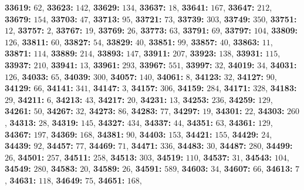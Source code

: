 \textsf{\bfseries 33619:} $62$, \textsf{\bfseries 33623:} $142$, \textsf{\bfseries 33629:} $134$, \textsf{\bfseries 33637:} $18$, \textsf{\bfseries 33641:} $167$, \textsf{\bfseries 33647:} $212$, \textsf{\bfseries 33679:} $154$, \textsf{\bfseries 33703:} $47$, \textsf{\bfseries 33713:} $95$, \textsf{\bfseries 33721:} $73$, \textsf{\bfseries 33739:} $303$, \textsf{\bfseries 33749:} $350$, \textsf{\bfseries 33751:} $12$, \textsf{\bfseries 33757:} $2$, \textsf{\bfseries 33767:} $19$, \textsf{\bfseries 33769:} $26$, \textsf{\bfseries 33773:} $63$, \textsf{\bfseries 33791:} $69$, \textsf{\bfseries 33797:} $104$, \textsf{\bfseries 33809:} $126$, \textsf{\bfseries 33811:} $60$, \textsf{\bfseries 33827:} $54$, \textsf{\bfseries 33829:} $40$, \textsf{\bfseries 33851:} $99$, \textsf{\bfseries 33857:} $40$, \textsf{\bfseries 33863:} $11$, \textsf{\bfseries 33871:} $114$, \textsf{\bfseries 33889:} $214$, \textsf{\bfseries 33893:} $147$, \textsf{\bfseries 33911:} $207$, \textsf{\bfseries 33923:} $138$, \textsf{\bfseries 33931:} $115$, \textsf{\bfseries 33937:} $210$, \textsf{\bfseries 33941:} $13$, \textsf{\bfseries 33961:} $293$, \textsf{\bfseries 33967:} $551$, \textsf{\bfseries 33997:} $32$, \textsf{\bfseries 34019:} $34$, \textsf{\bfseries 34031:} $126$, \textsf{\bfseries 34033:} $65$, \textsf{\bfseries 34039:} $300$, \textsf{\bfseries 34057:} $140$, \textsf{\bfseries 34061:} $8$, \textsf{\bfseries 34123:} $32$, \textsf{\bfseries 34127:} $90$, \textsf{\bfseries 34129:} $66$, \textsf{\bfseries 34141:} $341$, \textsf{\bfseries 34147:} $3$, \textsf{\bfseries 34157:} $306$, \textsf{\bfseries 34159:} $284$, \textsf{\bfseries 34171:} $328$, \textsf{\bfseries 34183:} $29$, \textsf{\bfseries 34211:} $6$, \textsf{\bfseries 34213:} $43$, \textsf{\bfseries 34217:} $20$, \textsf{\bfseries 34231:} $13$, \textsf{\bfseries 34253:} $236$, \textsf{\bfseries 34259:} $129$, \textsf{\bfseries 34261:} $50$, \textsf{\bfseries 34267:} $32$, \textsf{\bfseries 34273:} $86$, \textsf{\bfseries 34283:} $77$, \textsf{\bfseries 34297:} $19$, \textsf{\bfseries 34301:} $22$, \textsf{\bfseries 34303:} $260$, \textsf{\bfseries 34313:} $28$, \textsf{\bfseries 34319:} $145$, \textsf{\bfseries 34327:} $434$, \textsf{\bfseries 34337:} $44$, \textsf{\bfseries 34351:} $63$, \textsf{\bfseries 34361:} $129$, \textsf{\bfseries 34367:} $197$, \textsf{\bfseries 34369:} $168$, \textsf{\bfseries 34381:} $90$, \textsf{\bfseries 34403:} $153$, \textsf{\bfseries 34421:} $155$, \textsf{\bfseries 34429:} $24$, \textsf{\bfseries 34439:} $92$, \textsf{\bfseries 34457:} $77$, \textsf{\bfseries 34469:} $71$, \textsf{\bfseries 34471:} $336$, \textsf{\bfseries 34483:} $30$, \textsf{\bfseries 34487:} $280$, \textsf{\bfseries 34499:} $26$, \textsf{\bfseries 34501:} $257$, \textsf{\bfseries 34511:} $258$, \textsf{\bfseries 34513:} $303$, \textsf{\bfseries 34519:} $110$, \textsf{\bfseries 34537:} $31$, \textsf{\bfseries 34543:} $104$, \textsf{\bfseries 34549:} $280$, \textsf{\bfseries 34583:} $20$, \textsf{\bfseries 34589:} $26$, \textsf{\bfseries 34591:} $589$, \textsf{\bfseries 34603:} $34$, \textsf{\bfseries 34607:} $66$, \textsf{\bfseries 34613:} $7$, \textsf{\bfseries 34631:} $118$, \textsf{\bfseries 34649:} $75$, \textsf{\bfseries 34651:} $168$, 
